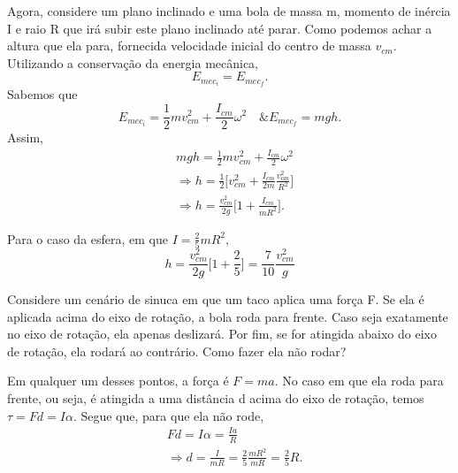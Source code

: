 \documentclass[PhysicsII/physicsII_notes.tex]{subfiles}
\begin{document}
Agora, considere um plano inclinado e uma bola de massa m, momento de inércia I e raio R que irá subir este plano inclinado até parar. Como podemos achar a altura que ela para,
fornecida velocidade inicial do centro de massa \(v_{cm}\). Utilizando a conservação da energia mecânica,
\[
	E_{mec_{i}} = E_{mec_{f}}.
\]
Sabemos que
\[
	E_{mec_{i}} = \frac{1}{2}mv_{cm}^{2} + \frac{I_{cm}}{2}\omega ^{2}\quad \& E_{mec_{f}} = mgh.
\]
Assim,
\begin{align*}
	 & mgh = \frac{1}{2} mv_{cm}^{2} + \frac{I_{cm}}{2}\omega^{2}                                      \\
	 & \Rightarrow h = \frac{1}{2}\biggl[v_{cm}^{2} + \frac{I_{cm}}{2m}\frac{v_{cm}^{2}}{R^{2}}\biggr] \\
	 & \Rightarrow h = \frac{v_{cm}^{2}}{2g}\biggl[1 + \frac{I_{cm}}{mR^{2}}\biggr].
\end{align*}
\begin{example}
	Para o caso da esfera, em que \(I = \frac{2}{5}mR^{2},\)
	\[
		h = \frac{v_{cm}^{2}}{2g}\biggl[1 + \frac{2}{5}\biggr] = \frac{7}{10}\frac{v_{cm}^{2}}{g}
	\]
\end{example}
\begin{example}
	Considere um cenário de sinuca em que um taco aplica uma força F. Se ela é aplicada acima do eixo de rotação, a bola roda para frente. Caso seja exatamente no eixo de rotação,
	ela apenas deslizará. Por fim, se for atingida abaixo do eixo de rotação, ela rodará ao contrário. Como fazer ela não rodar?

	Em qualquer um desses pontos, a força é \(F=ma.\) No caso em que ela roda para frente, ou seja, é atingida a uma distância d acima do eixo de rotação,
	temos \(\tau = Fd = I\alpha.\) Segue que, para que ela não rode,
	\begin{align*}
		 & Fd = I\alpha = \frac{Ia}{R}                                                 \\
		 & \Rightarrow d = \frac{I}{mR} = \frac{2}{5}\frac{mR^{2}}{mR} = \frac{2}{5}R.
	\end{align*}
\end{example}
\end{document}
